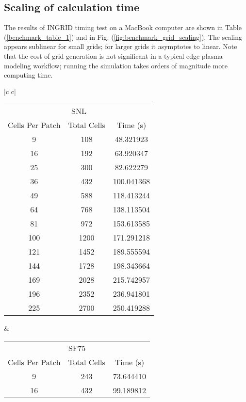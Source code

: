 \subsection{Scaling of calculation time}

The results of INGRID timing test on a MacBook computer are shown in
Table (\ref{benchmark_table_1}) and in
Fig. (\ref{fig:benchmark_grid_scaling}). The scaling appears sublinear
for small grids; for larger grids it asymptotes to linear. Note that
the cost of grid generation is not significant in a typical edge
plasma modeling workflow; running the simulation takes orders of
magnitude more computing time.

\begin{tabular}{|c c|}
    \begin{tabular}{c|c|c|}
        \toprule
        \multicolumn{3}{c|}{SNL}\\
        \cline{1-3}
        {Cells Per Patch} & Total Cells &    Time (s) \\
        \midrule
        9  &       108 &   48.321923 \\
        16  &       192 &   63.920347 \\
        25  &       300 &   82.622279 \\
        36  &       432 &  100.041368 \\
        49  &       588 &  118.413244 \\
        64  &       768 &  138.113504 \\
        81  &       972 &  153.613585 \\
        100  &      1200 &  171.291218 \\
        121  &      1452 &  189.555594 \\
        144  &      1728 &  198.343664 \\
        169 &      2028 &  215.742957 \\
        196 &      2352 &  236.941801 \\
        225 &      2700 &  250.419288 \\
        \bottomrule
    \end{tabular}
    \quad
    &
    \begin{tabular}{|c|c|c}
        \toprule
        \multicolumn{3}{|c}{SF75}\\
        \cline{1-3}
        {Cells Per Patch} & Total Cells &   Time (s) \\
        \midrule
        9  &       243 &   73.644410 \\
        16  &       432 &   99.189812 \\

\end{tabular}
\end{tabular}
